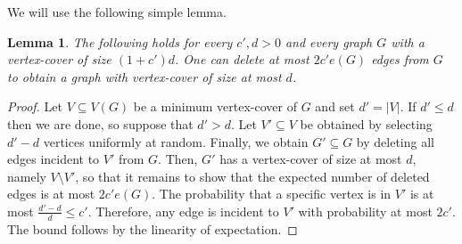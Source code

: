 \documentclass[10pt]{article}
\newtheorem{lemma}[theorem]{Lemma}
\theoremstyle{definition}
\let\leq\leqslant
\begin{document}
\noindent We will use the following simple lemma.
\begin{lemma}\label{lem: remove o(1)}
    The following holds for every $c',d>0$ and every graph $G$ with a vertex-cover of size $(1+c')d$. One can delete at most $2c'e(G)$ edges from $G$ to obtain a graph with vertex-cover of size at most $d$.
\end{lemma}
\begin{proof}
    Let $V\subseteq V(G)$ be a minimum vertex-cover of $G$ and set $d'=|V|$. If $d'\leq d$ then we are done, so suppose that $d'>d$. Let $V'\subseteq V$ be obtained by selecting $d'-d$ vertices uniformly at random. Finally, we obtain $G'\subseteq G$ by deleting all edges incident to $V'$ from $G$. Then, $G'$ has a vertex-cover of size at most $d$, namely $V\setminus V'$, so that it remains to show that the expected number of deleted edges is at most $2c'e(G)$. The probability that a specific vertex is in $V'$ is at most $\frac{d'-d}{d}\leq c'$. Therefore, any edge is incident to $V'$ with probability at most $2c'$. The bound follows by the linearity of expectation. 
\end{proof}
\end{document}
